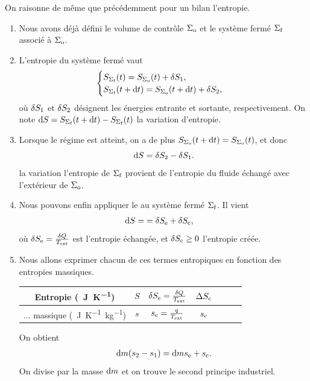 \documentclass[12pt,fancy]{cours}
\begin{document}
On raisonne de même que précédemment pour un bilan l’entropie.
\begin{enumerate}
  \item Nous avons déjà défini le volume de contrôle $\Sigma_{\rm o}$ et le système fermé $\Sigma_{\rm f}$ associé à $\Sigma_{\rm o}$.
  \item L'entropie du système fermé vaut
  \begin{equation}
    \begin{cases}
      S_{\Sigma_{\rm f}}(t) =S_{\Sigma_{\rm{o}}}(t)+\delta S_{\rm{1}},\\
      S_{\Sigma_{\rm f}}(t+\mathrm{d} t ) =S_{\Sigma_{\rm{o}}}(t+\mathrm{d} t)+\delta S_{\rm{2}},
    \end{cases}
  \end{equation}
où $\delta S_{\rm{1}}$ et $\delta S_{\rm{2}}$ désignent les énergies entrante et sortante, respectivement. On note $\mathrm{d} S = S_{\Sigma_{\rm{f}}}(t+\mathrm{d} t) - S_{\Sigma_{\rm{f}}}(t)$ la variation d'entropie. 
\item 
Lorsque le régime  est atteint, on a de plus $S_{\Sigma_{\rm{o}}}(t+\mathrm{d} t) = S_{\Sigma_{\rm{o}}}(t)$, et donc
\begin{equation}
\mathrm{d} S = \delta S_{\rm 2} - \delta S_{\rm 1}.
\end{equation}
 la variation l'entropie de $\Sigma_{\rm f}$ provient de l'entropie du fluide échangé avec l’extérieur de $\Sigma_{\rm o}$.  
 \item Nous pouvons enfin appliquer le  au système fermé $\Sigma_{\rm f}$. Il vient
 \begin{align}\label{eq:Ee_ouvert}
 \mathrm{d} S = & = \delta S_{\rm e} + \delta S_{\rm c},
 \end{align}
 où $\delta S_{\rm e} = \frac{\delta Q}{T_{\rm ext}}$ est l'entropie échangée, et $\delta S_{\rm c}\geq 0$ l'entropie créée.
 \item 
Nous allons exprimer chacun de ces termes entropiques en fonction des entropies massiques.
\begin{table}[h!]
  \centering
  \renewcommand{\arraystretch}{1.5}
  \begin{tabular}{|c|c| c| c| c| c| c| }
    \hline
    Entropie (\SI{}{J.K^{-1}}) & $S$ &  $\delta S_{\rm e} = \frac{\delta Q}{T_{\rm ext}}$ & $\Delta S_{\rm c}$ \\
    \hline
    ... massique (\SI{}{J.K^{-1}.kg^{-1}}) & $s$   & $s_{\rm e} = \frac{q}{T_{\rm ext}}$ & $s_{\rm c} $ \\
    \hline
  \end{tabular}
\end{table}

On obtient
  \begin{align}\label{eq:Se_ouvert}
    \mathrm{d} m (s_2 - s_1) = \mathrm{d} m s_{\rm e}  + s_{\rm c}.
    \end{align}
On divise par la masse $\mathrm{d} m$ et on trouve le second principe industriel.
\end{enumerate}
\end{document}
